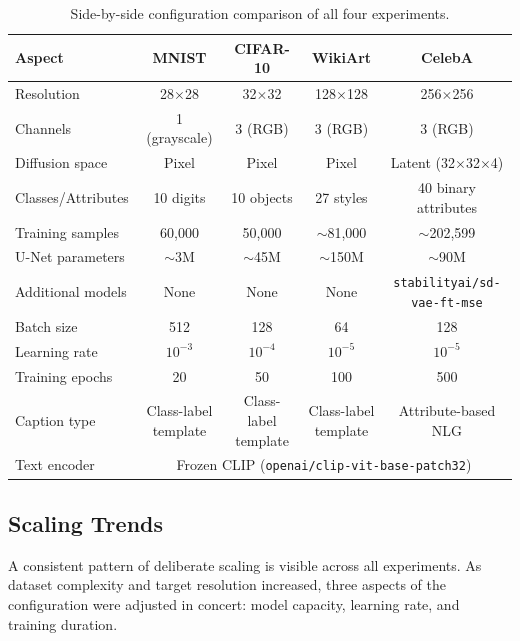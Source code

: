 \begin{table}[htbp]
    \centering
    \caption{Side-by-side configuration comparison of all four experiments.}
    \label{tab:all_experiments_comparison}
    \small
    \begin{tabular}{lcccc}
        \toprule
        \textbf{Aspect} & \textbf{MNIST} & \textbf{CIFAR-10} & \textbf{WikiArt} & \textbf{CelebA} \\
        \midrule
        Resolution & 28$\times$28 & 32$\times$32 & 128$\times$128 & 256$\times$256 \\
        Channels & 1 (grayscale) & 3 (RGB) & 3 (RGB) & 3 (RGB) \\
        Diffusion space & Pixel & Pixel & Pixel & Latent (32$\times$32$\times$4) \\
        Classes/Attributes & 10 digits & 10 objects & 27 styles & 40 binary attributes \\
        Training samples & 60,000 & 50,000 & $\sim$81,000 & $\sim$202,599 \\
        U-Net parameters & $\sim$3M & $\sim$45M & $\sim$150M & $\sim$90M \\
        Additional models & None & None & None & \texttt{stabilityai/sd-vae-ft-mse} \\
        Batch size & 512 & 128 & 64 & 128 \\
        Learning rate & $10^{-3}$ & $10^{-4}$ & $10^{-5}$ & $10^{-5}$ \\
        Training epochs & 20 & 50 & 100 & 500 \\
        Caption type & Class-label template & Class-label template & Class-label template & Attribute-based NLG\footnotemark \\
        Text encoder & \multicolumn{4}{c}{Frozen CLIP (\texttt{openai/clip-vit-base-patch32})} \\
        \bottomrule
    \end{tabular}
\end{table}

\subsection{Scaling Trends}

A consistent pattern of deliberate scaling is visible across all experiments. As dataset complexity and target resolution increased, three aspects of the configuration were adjusted in concert: model capacity, learning rate, and training duration.

